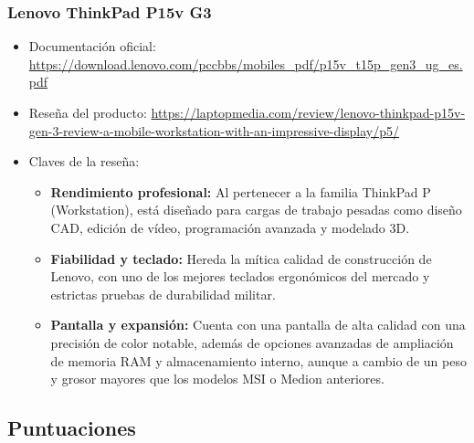 \documentclass[11.5pt]{article}
\begin{document}
	\subsubsection*{Lenovo ThinkPad P15v G3}
	\begin{itemize}
		\item Documentación oficial: \url{https://download.lenovo.com/pccbbs/mobiles_pdf/p15v_t15p_gen3_ug_es.pdf}
		\item Reseña del producto: \url{https://laptopmedia.com/review/lenovo-thinkpad-p15v-gen-3-review-a-mobile-workstation-with-an-impressive-display/p5/}
		\item Claves de la reseña:
		\begin{itemize}[label=$\bullet$]
			\item \textbf{Rendimiento profesional:} Al pertenecer a la familia ThinkPad P (Workstation), está diseñado para cargas de trabajo pesadas como diseño CAD, edición de vídeo, programación avanzada y modelado 3D.
			\item \textbf{Fiabilidad y teclado:} Hereda la mítica calidad de construcción de Lenovo, con uno de los mejores teclados ergonómicos del mercado y estrictas pruebas de durabilidad militar.
			\item \textbf{Pantalla y expansión:} Cuenta con una pantalla de alta calidad con una precisión de color notable, además de opciones avanzadas de ampliación de memoria RAM y almacenamiento interno, aunque a cambio de un peso y grosor mayores que los modelos MSI o Medion anteriores.
		\end{itemize}
	\end{itemize}
	
	\subsection{Puntuaciones}
	
\end{document}
